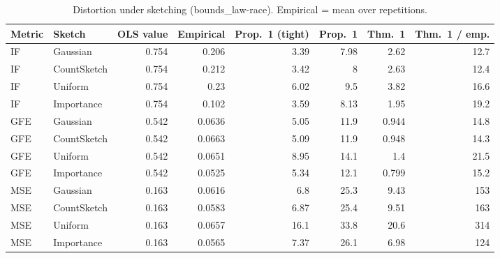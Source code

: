 \begin{table}[t]
\centering
\small
\begin{tabular}{llrrrrrr}
\toprule
Metric & Sketch & OLS value & Empirical & Prop.~1 (tight) & Prop.~1 & Thm.~1 & Thm.~1 / emp. \\
\midrule
IF & Gaussian & 0.754 & 0.206 & 3.39 & 7.98 & 2.62 & 12.7 \\
IF & CountSketch & 0.754 & 0.212 & 3.42 & 8 & 2.63 & 12.4 \\
IF & Uniform & 0.754 & 0.23 & 6.02 & 9.5 & 3.82 & 16.6 \\
IF & Importance & 0.754 & 0.102 & 3.59 & 8.13 & 1.95 & 19.2 \\
\midrule
GFE & Gaussian & 0.542 & 0.0636 & 5.05 & 11.9 & 0.944 & 14.8 \\
GFE & CountSketch & 0.542 & 0.0663 & 5.09 & 11.9 & 0.948 & 14.3 \\
GFE & Uniform & 0.542 & 0.0651 & 8.95 & 14.1 & 1.4 & 21.5 \\
GFE & Importance & 0.542 & 0.0525 & 5.34 & 12.1 & 0.799 & 15.2 \\
\midrule
MSE & Gaussian & 0.163 & 0.0616 & 6.8 & 25.3 & 9.43 & 153 \\
MSE & CountSketch & 0.163 & 0.0583 & 6.87 & 25.4 & 9.51 & 163 \\
MSE & Uniform & 0.163 & 0.0657 & 16.1 & 33.8 & 20.6 & 314 \\
MSE & Importance & 0.163 & 0.0565 & 7.37 & 26.1 & 6.98 & 124 \\
\bottomrule
\end{tabular}
\caption{Distortion under sketching (bounds_law-race). Empirical = mean over repetitions.}
\label{tab:bounds_law-race}
\end{table}